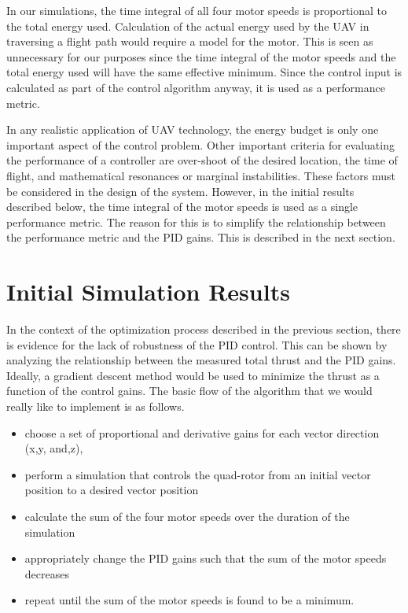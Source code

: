 In our simulations, the time integral of all four motor speeds is proportional to the total energy used. Calculation of the actual energy used by the UAV in traversing a flight path would require a model for the motor. This is seen as unnecessary for our purposes since the time integral of the motor speeds and the total energy used will have the same effective minimum. Since the control input is calculated as part of the control algorithm anyway, it is used as a performance metric.


In any realistic application of UAV technology, the energy budget is only one important aspect of the control problem. Other important criteria for evaluating the performance of a controller are over-shoot of the desired location, the time of flight, and mathematical resonances or marginal instabilities. These factors must be considered in the design of the system. However, in the initial results described below, the time integral of the motor speeds is used as a single performance metric. The reason for this is to simplify the relationship between the performance metric and the PID gains. This is described in the next section.


\section{Initial Simulation Results}

In the context of the optimization process described in the previous section, there is evidence for the lack of robustness of the PID control. This can be shown by analyzing the relationship between the measured total thrust and the PID gains. Ideally, a gradient descent method would be used to minimize the thrust as a function of the control gains. The basic flow of the algorithm that we would really like to implement is as follows.

\begin{itemize}
\item choose a set of proportional and derivative gains for each vector direction (x,y, and,z),
\item perform a simulation that controls the quad-rotor from an initial vector position to a desired vector position  
\item calculate the sum of the four motor speeds over the duration of the simulation
\item appropriately change the PID gains such that the sum of the motor speeds decreases
\item repeat until the sum of the motor speeds is found to be a minimum.
\end{itemize}

